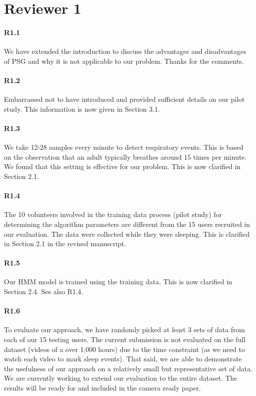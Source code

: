 \section*{Reviewer 1}

\paragraph{R1.1} We have extended the introduction to discuss the advantages and disadvantages of PSG and why it is not applicable to our
problem. Thanks for the comments.

\paragraph{R1.2} Embarrassed not to have introduced and provided sufficient details on our pilot study. This information is now given in Section 3.1.

\paragraph{R1.3} We take 12-28 samples every minute to detect respiratory events. This is based on the observation that an adult typically
breathes around 15 times per minute. We found that this setting is effective for our problem. This is now clarified in Section 2.1.

\paragraph{R1.4} The 10 volunteers involved in the training data process (pilot study) for determining the algorithm parameters are different from the 15 users recruited in our
evaluation. The data were collected while they were sleeping. This is clarified in Section 2.1 in the revised manuscript.

\paragraph{R1.5} Our HMM model is trained using the training data. This is now clarified in Section 2.4. See also R1.4.
\vspace{-2mm}
\paragraph{R1.6} To evaluate our approach, we have randomly picked at least 3 sets of data from each of our 15 testing users.
The current submission is not evaluated on the full dataset (videos of a over 1,000 hours) due to the time constraint (as we need to watch
each video to mark sleep events). That said, we are able to demonstrate the usefulness of our approach on a relatively small but
representative set of data. We are currently working to extend our evaluation to the entire dataset. The results will be ready for and
included in the camera ready paper.

